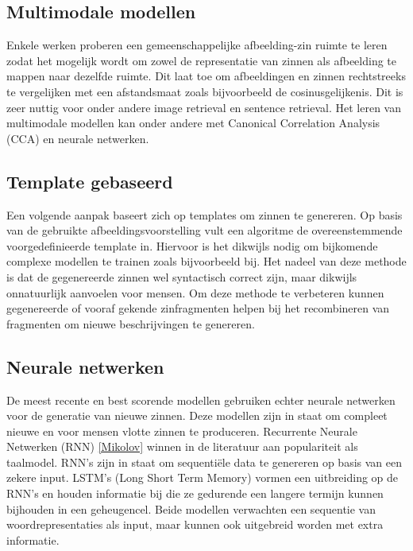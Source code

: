 \subsection{Multimodale modellen}
Enkele werken proberen een gemeenschappelijke afbeelding-zin ruimte te leren zodat het mogelijk wordt om zowel de representatie van zinnen als afbeelding te mappen naar dezelfde ruimte. Dit laat toe om afbeeldingen en zinnen rechtstreeks te vergelijken met een afstandsmaat zoals bijvoorbeeld de cosinusgelijkenis. Dit is zeer nuttig voor onder andere image retrieval en sentence retrieval. Het leren van multimodale modellen kan onder andere met Canonical Correlation Analysis (CCA)\cite{Hodosh2013} en neurale netwerken. \cite{Mao2014}\cite{Karpathy2014}\cite{Fang}

\subsection{Template gebaseerd}
Een volgende aanpak baseert zich op templates om zinnen te genereren. Op basis van de gebruikte afbeeldingsvoorstelling vult een algoritme de overeenstemmende voorgedefinieerde template in.\cite{Yang} Hiervoor is het dikwijls nodig om bijkomende complexe modellen te trainen zoals bijvoorbeeld bij\cite{Elliott}. Het nadeel van deze methode is dat de gegenereerde zinnen wel syntactisch correct zijn, maar dikwijls onnatuurlijk aanvoelen voor mensen. Om deze methode te verbeteren kunnen gegenereerde of vooraf gekende zinfragmenten helpen bij het recombineren van fragmenten om nieuwe beschrijvingen te genereren. \cite{Mitchell}\cite{Kuznetsova}

\subsection{Neurale netwerken}
De meest recente en best scorende modellen gebruiken echter neurale netwerken voor de generatie van nieuwe zinnen. Deze modellen zijn in staat om compleet nieuwe en voor mensen vlotte zinnen te produceren. Recurrente Neurale Netwerken (RNN) \ref{Mikolov} winnen in de literatuur aan populariteit als taalmodel. RNN's zijn in staat om sequenti\"ele data te genereren op basis van een zekere input. LSTM's (Long Short Term Memory) vormen een uitbreiding op de RNN's en houden informatie bij die ze gedurende een langere termijn kunnen bijhouden in een geheugencel. Beide modellen verwachten een sequentie van woordrepresentaties als input, maar kunnen ook uitgebreid worden met extra informatie. \cite{Kiros}\cite{Xu}\cite{Socher} 

